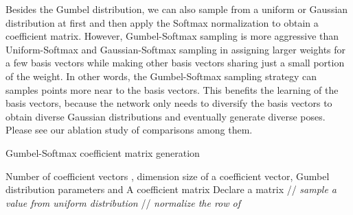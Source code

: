 \documentclass[sigconf,screen,nonacm]{acmart}
\begin{document}
	Besides the Gumbel distribution, we can also sample from a uniform or Gaussian distribution at first and then apply the Softmax normalization to obtain a coefficient matrix. However, Gumbel-Softmax sampling is more aggressive than Uniform-Softmax and Gaussian-Softmax sampling in assigning larger weights for a few basis vectors while making other basis vectors sharing just a small portion of the weight. In other words, the Gumbel-Softmax sampling strategy can samples points more near to the basis vectors. This benefits the learning of the basis vectors, because the network only needs to diversify the basis vectors to obtain diverse Gaussian distributions and eventually generate diverse poses. Please see our ablation study of comparisons among them.
	


	
	
	\begin{algorithm}[!t]
		\caption{Gumbel-Softmax coefficient matrix generation}\label{alg:gumbel-softmax}
		\begin{algorithmic}[1]
			\Require Number of coefficient vectors , dimension size  of a coefficient vector, Gumbel distribution parameters  and 
			\Ensure A coefficient matrix 
			\State Declare a matrix 
			\State  // \textit{sample a value from uniform distribution}
			\State 
			\State 
			\EndFor
			\State  // \textit{normalize the  row of }
			\EndFor
		\end{algorithmic}
	\end{algorithm}
	
\end{document}
